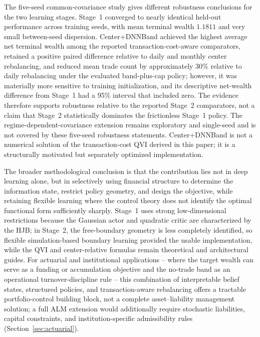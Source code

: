 \documentclass[a4paper,10pt]{article}
\begin{document}
The five-seed common-covariance study gives different robustness conclusions for the two learning stages. Stage~1 converged to nearly identical held-out performance across training seeds, with mean terminal wealth $1.1811$ and very small between-seed dispersion. Center+DNNBand achieved the highest average net terminal wealth among the reported transaction-cost-aware comparators, retained a positive paired difference relative to daily and monthly center rebalancing, and reduced mean trade count by approximately 30\% relative to daily rebalancing under the evaluated band-plus-cap policy; however, it was materially more sensitive to training initialization, and its descriptive net-wealth difference from Stage~1 had a 95\% interval that included zero. The evidence therefore supports robustness relative to the reported Stage~2 comparators, not a claim that Stage~2 statistically dominates the frictionless Stage~1 policy. The regime-dependent-covariance extension remains exploratory and single-seed and is not covered by these five-seed robustness statements. Center+DNNBand is not a numerical solution of the transaction-cost QVI derived in this paper; it is a structurally motivated but separately optimized implementation.

The broader methodological conclusion is that the contribution lies not in deep learning alone, but in selectively using financial structure to determine the information state, restrict policy geometry, and design the objective, while retaining flexible learning where the control theory does not identify the optimal functional form sufficiently sharply. Stage~1 uses strong low-dimensional restrictions because the Gaussian actor and quadratic critic are characterized by the HJB; in Stage~2, the free-boundary geometry is less completely identified, so flexible simulation-based boundary learning provided the usable implementation, while the QVI and center-relative formulas remain theoretical and architectural guides. For actuarial and institutional applications -- where the target wealth can serve as a funding or accumulation objective and the no-trade band as an operational turnover-discipline rule -- this combination of interpretable belief states, structured policies, and transaction-aware rebalancing offers a tractable portfolio-control building block, not a complete asset--liability management solution; a full ALM extension would additionally require stochastic liabilities, capital constraints, and institution-specific admissibility rules (Section~\ref{sec:actuarial}).
\end{document}
